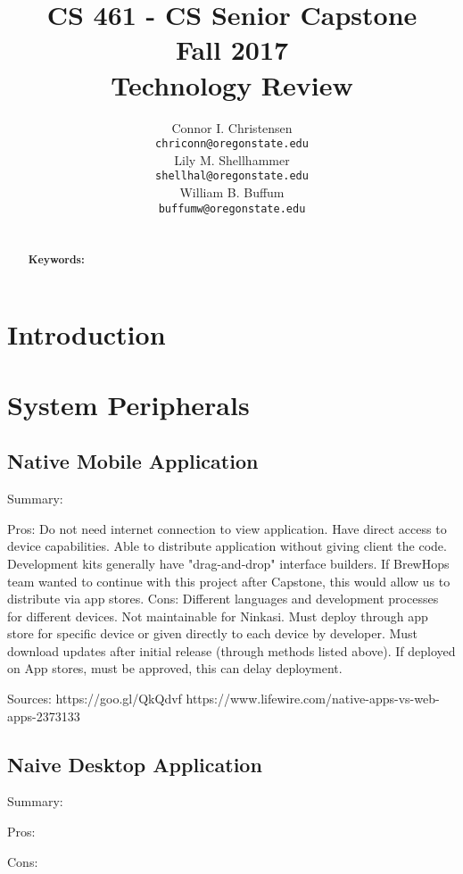 \documentclass[draftclsnofoot,onecolumn,letterpaper,10pt,compsoc]{IEEEtran}
\title{CS 461 - CS Senior Capstone
	\\Fall 2017
	\\Technology Review
}
\author{
	Connor I. Christensen \\
	\texttt{chriconn@oregonstate.edu}
	\\
	Lily M. Shellhammer \\
	\texttt{shellhal@oregonstate.edu}
	\\
	William B. Buffum \\
	\texttt{buffumw@oregonstate.edu}
}
\begin{document}
\begin{titlingpage}
    \maketitle
    \begin{abstract}
			\\
			\textbf{Keywords:}
    \end{abstract}
		\pagebreak
		\tableofcontents
\end{titlingpage}

\section{Introduction}

\section{System Peripherals}
	\subsection{Native Mobile Application}
    Summary:
    
    Pros:
        Do not need internet connection to view application.
        Have direct access to device capabilities.
        Able to distribute application without giving client the code.
        Development kits generally have "drag-and-drop" interface builders.
        If BrewHops team wanted to continue with this project after             Capstone, this would allow us to distribute via app stores.
    Cons:
        Different languages and development processes for different devices.
        Not maintainable for Ninkasi.
        Must deploy through app store for specific device or given directly     to each device by developer.
        Must download updates after initial release (through methods listed     above).
        If deployed on App stores, must be approved, this can delay             deployment.
    
    Sources:
    https://goo.gl/QkQdvf
    https://www.lifewire.com/native-apps-vs-web-apps-2373133
        
    
	\subsection{Naive Desktop Application}
    Summary:
    
    Pros:
    
    Cons:
    
\end{document}
